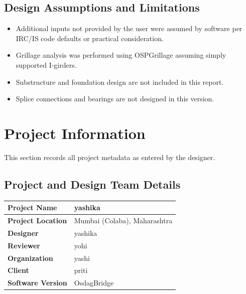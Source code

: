 \documentclass[12pt,a4paper]{report}
\numberwithin{table}{chapter}
\numberwithin{figure}{chapter}
\begin{document}
\section*{Design Assumptions and Limitations}
\label{sec:assumptions}

\begin{itemize}
\item Additional inputs not provided by the user were assumed by software per IRC/IS code defaults or practical consideration.
\item Grillage analysis was performed using OSPGrillage assuming simply supported I-girders.
\item Substructure and foundation design are not included in this report.
\item Splice connections and bearings are not designed in this version.
\end{itemize}

\titleformat{\chapter}[block]{\normalfont\Large\bfseries\centering}{\thechapter}{1em}{}
\titlespacing*{\chapter}{0pt}{-30pt}{10pt}


\chapter{Project Information}

This section records all project metadata as entered by the designer.

\section{Project and Design Team Details}
\label{sec:project-details}

\begin{tabular}{|L{5.5cm}|L{8.5cm}|}
\hline
\textbf{Project Name} & yashika \\
\hline
\textbf{Project Location} & Mumbai (Colaba), Maharashtra \\
\hline
\textbf{Designer} & yashika \\
\hline
\textbf{Reviewer} & yohi \\
\hline
\textbf{Organization} & yashi \\
\hline
\textbf{Client} & priti \\
\hline
\textbf{Software Version} & OsdagBridge \\
\hline
\end{tabular}
\end{document}
